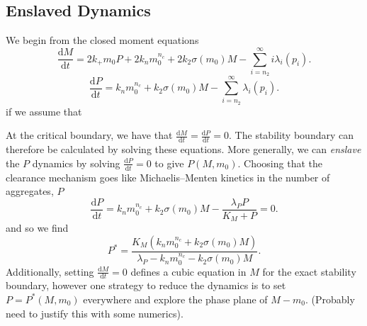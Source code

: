 \subsection{Enslaved Dynamics}
We begin from the closed moment equations
\begin{equation}
    \frac{\text{d}M}{\text{d}t} = 2 k_+m_0 P+2k_n m_0^{n_c}+2k_2\sigma(m_0)M-\sum_{i=n_2}^{\infty}i\lambda_i (p_i).
\end{equation}
\begin{equation}
    \frac{\text{d}P}{\text{d}t} = k_n m_0^{n_c}+k_2\sigma(m_0)M-\sum_{i=n_2}^{\infty}\lambda_i (p_i).
\end{equation}
if we assume that 

At the critical boundary, we have that $\frac{\text{d}M}{\text{d}t}=\frac{\text{d}P}{\text{d}t}=0$. The stability boundary can therefore be calculated by solving these equations. More generally, we can \textit{enslave} the $P$ dynamics by solving $\frac{\text{d}P}{\text{d}t}=0$ to give $P(M, m_0)$. Choosing that the clearance mechanism goes like Michaelis–Menten kinetics in the number of aggregates, $P$
\begin{equation}
    \frac{\text{d}P}{\text{d}t} = k_n m_0^{n_c}+k_2\sigma(m_0)M-\frac{\lambda_P P}{K_M + P}=0.
\end{equation}
and so we find
\begin{equation}
    P^* = \frac{K_M\left(k_n m_0^{n_c}+k_2\sigma(m_0)M\right)}{\lambda_P-k_n m_0^{n_c}-k_2\sigma(m_0)M}.
\end{equation}
Additionally, setting $\frac{\text{d}M}{\text{d}t}=0$ defines a cubic equation in $M$ for the exact stability boundary, however one strategy to reduce the dynamics is to set $P=P^*(M, m_0)$ everywhere and explore the phase plane of $M-m_0$. (Probably need to justify this with some numerics).


